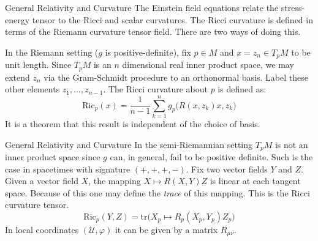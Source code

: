 \documentclass{beamer}
\begin{document}
    \begin{frame}{General Relativity and Curvature}
        The Einstein field equations relate the stress-energy tensor to the
        Ricci and scalar curvatures. The Ricci curvature is defined in terms of
        the Riemann curvature tensor field. There are two ways of doing this.
        \par\hfill\par
        In the Riemann setting ($g$ is positive-definite), fix $p\in{M}$ and
        $x=z_{n}\in{T}_{p}M$ to be unit length. Since $T_{p}M$ is an $n$
        dimensional real inner product space, we may extend $z_{n}$ via the
        Gram-Schmidt procedure to an orthonormal basis. Label these other
        elements $z_{1},\dots,z_{n-1}$. The Ricci curvature about $p$ is defined
        as:
        \begin{equation}
            \textrm{Ric}_{p}(x)=\frac{1}{n-1}\sum_{k=1}^{n}g_{p}
                \Big(R(x,z_{k})x,z_{k}\Big)
        \end{equation}
        It is a theorem that this result is independent of the choice of
        basis.
    \end{frame}
    \begin{frame}{General Relativity and Curvature}
        In the semi-Riemannian setting $T_{p}M$ is not an inner product space
        since $g$ can, in general, fail to be positive definite. Such is the
        case in spacetimes with signature $(+,+,+,-)$. Fix two vector fields
        $Y$ and $Z$. Given a vector field $X$, the mapping
        $X\mapsto{R}(X,Y)Z$ is linear at each tangent space. Because of this
        one may define the \textit{trace} of this mapping. This is the Ricci
        curvature tensor.
        \begin{equation}
            \textrm{Ric}_{p}(Y,Z)=\textrm{tr}
                \big(X_{p}\mapsto{R}_{p}(X_{p},Y_{p})Z_{p}\big)
        \end{equation}
        In local coordinates $(\mathcal{U},\varphi)$ it can be given by a
        matrix $R_{\mu\nu}$.
    \end{frame}
\end{document}
